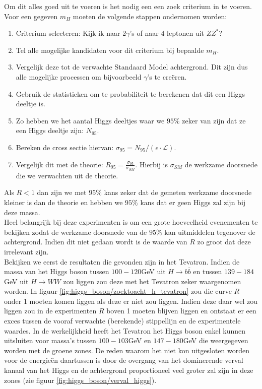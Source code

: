 \documentclass[../main.tex]{subfiles}
\begin{document}
Om dit alles goed uit te voeren is het nodig een een zoek criterium in te voeren. Voor een gegeven $m_H$ moeten de volgende stappen ondernomen worden:
\begin{enumerate}
    \item Criterium selecteren: Kijk ik naar 2$\gamma$'s of naar 4 leptonen uit $ZZ^*$?
    \item Tel alle mogelijke kandidaten voor dit criterium bij bepaalde $m_H$.
    \item Vergelijk deze tot de verwachte Standaard Model achtergrond. Dit zijn dus alle mogelijke processen om bijvoorbeeld $\gamma$'s te creëren.
    \item Gebruik de statistieken om te probabiliteit te berekenen dat dit een Higgs deeltje is.
    \item Zo hebben we het aantal Higgs deeltjes waar we $95\%$ zeker van zijn dat ze een Higgs deeltje zijn: $N_{95}$.
    \item Bereken de cross sectie hiervan: $\sigma_{95}=N_{95} /(\epsilon \cdot \mathcal{L})$.
    \item Vergelijk dit met de theorie: $R_{95}=\frac{\sigma_{95}}{\sigma_{S M}}$. Hierbij is $\sigma_{S M}$ de werkzame doorsnede die we verwachten uit de theorie.
\end{enumerate}
Als $R<1$ dan zijn we met $95\%$ kans zeker dat de gemeten werkzame doorsnede kleiner is dan de theorie en hebben we $95\%$ kans dat er geen Higgs zal zijn bij deze massa.\\
Heel belangrijk bij deze experimenten is om een grote hoeveelheid evenementen te bekijken zodat de werkzame doorsnede van de $95\%$ kan uitmiddelen tegenover de achtergrond. Indien dit niet gedaan wordt is de waarde van $R$ zo groot dat deze irrelevant zijn.\\
Bekijken we eerst de resultaten die gevonden zijn in het Tevatron. Indien de massa van het Higgs boson tussen $100-120$GeV uit $H \rightarrow b \bar{b}$ en tussen $139-184$GeV uit $H \rightarrow W W$ zou liggen zou deze met het Tevatron zeker waargenomen worden. In figuur \ref{fig:higgs_boson/zoektoacht_h_tevatron} zou die curve $R$ onder 1 moeten komen liggen als deze er niet zou liggen. Indien deze daar wel zou liggen zou in de experimenten $R$ boven 1 moeten blijven liggen en ontstaat er een exces tussen de vooraf verwachte (berekende) stippellijn en de experimentele waardes. In de werkelijkheid heeft het Tevatron het Higgs boson enkel kunnen uitsluiten voor massa's tussen $100-103$GeV en $147-180$GeV die weergegeven worden met de groene zones. De reden waarom het niet kon uitgesloten worden voor de energieën daartussen is door de overgang van het dominerende verval kanaal van het Higgs en de achtergrond proportioneel veel groter zal zijn in deze zones (zie figuur \ref{fig:higgs_boson/verval_higgs}).
\end{document}

